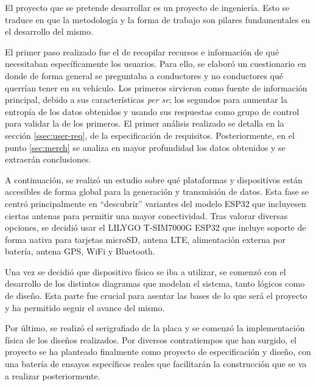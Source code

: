 El proyecto que se pretende desarrollar es un proyecto de ingeniería. Esto se
traduce en que la metodología y la forma de trabajo son pilares fundamentales
en el desarrollo del mismo.

El primer paso realizado fue el de recopilar recursos e información de qué
necesitaban específicamente los usuarios. Para ello, se elaboró un cuestionario
en donde de forma general se preguntaba a conductores y no conductores qué querrían
tener en su vehículo. Los primeros sirvieron como fuente de información principal,
debido a sus características \textit{per se}; los segundos para aumentar la entropía
de los datos obtenidos y usando sus respuestas como grupo de control para validar la
de los primeros. El primer análisis realizado se detalla
en la sección \ref{ssec:user-req}, de la especificación de requisitos. Posteriormente,
en el punto \ref{sec:merch} se analiza en mayor profundidad los datos obtenidos
y se extraerán conclusiones.

A continuación, se realizó un estudio sobre qué plataformas y dispositivos están
accesibles de forma global para la generación y transmisión de datos. Esta fase
se centró principalmente en ``descubrir'' variantes del modelo ESP32 que incluyesen
ciertas antenas para permitir una mayor conectividad. Tras valorar diversas opciones,
se decidió usar el LILYGO T-SIM7000G ESP32 que incluye soporte de forma nativa para
tarjetas microSD, antena \ac{LTE}, alimentación externa por batería, antena \ac{GPS}, WiFi y
Bluetooth.

Una vez se decidió que dispositivo físico se iba a utilizar, se comenzó con el desarrollo
de los distintos diagramas que modelan el sistema, tanto lógicos como de diseño. Esta
parte fue crucial para asentar las bases de lo que será el proyecto y ha permitido seguir
el avance del mismo.

Por último, se realizó el serigrafiado de la placa y se comenzó la implementación
física de los diseños realizados. Por diversos contratiempos que han surgido, el proyecto
se ha planteado finalmente como proyecto de especificación y diseño, con una batería
de ensayos específicos reales que facilitarán la construcción que se va a realizar
posteriormente.
